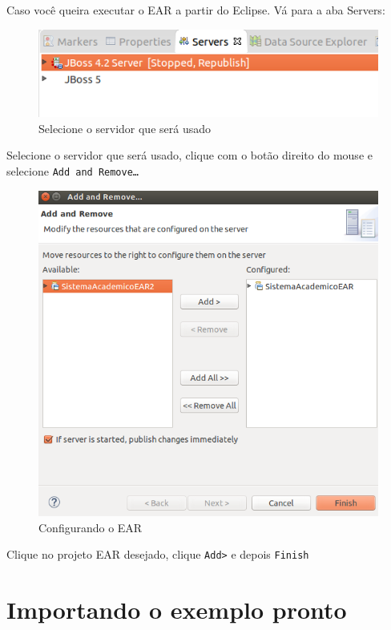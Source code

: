 Caso você queira executar o EAR a partir do Eclipse. Vá para a aba Servers:

\begin{figure}[H]
	\centering
	\includegraphics[scale=0.4]{files/imgs/gwt-11.png}
	\caption{Selecione o servidor que será usado}
	\label{gwt11}
\end{figure}

Selecione o servidor que será usado, clique com o botão direito do mouse e selecione \texttt{Add and Remove\ldots}

\begin{figure}[H]
	\centering
	\includegraphics[scale=0.4]{files/imgs/gwt-12.png}
	\caption{Configurando o EAR}
	\label{gwt12}
\end{figure}

Clique no projeto EAR desejado, clique \texttt{Add>} e depois \texttt{Finish}

\section{Importando o exemplo pronto}

